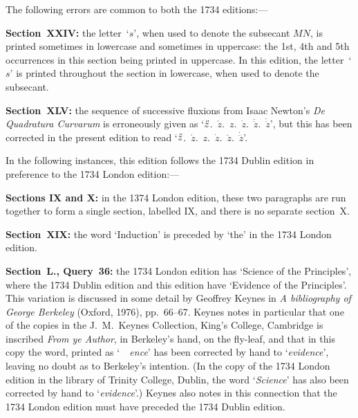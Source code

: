 \vfill\eject

The following errors are common to both the 1734 editions:---

\smallskip

\item{}
{\bf Section~XXIV:}
the letter~`$s$', when used to denote the subsecant $MN$, is
printed sometimes in lowercase and sometimes in uppercase: the
1st, 4th and 5th occurrences in this section being printed in
uppercase.  In this edition, the letter~`$s$' is printed
throughout the section in lowercase, when used to denote the
subsecant.

\smallskip

\item{}
{\bf Section~XLV:}
the sequence of successive fluxions from Isaac Newton's
{\it De Quadratura Curvarum\/} is erroneously given as
`$\doubleacute{z}$.\ $\acute{z}$.\ $z$.\ $\dot{z}$.\
$\ddot{\ddot{z}}$.\ $\dot{\ddot{z}}$', but this has been
corrected in the present edition to read
`$\doubleacute{z}$.\ $\acute{z}$.\ $z$.\ $\dot{z}$.\
$\ddot{z}$.\ $\dot{\ddot{z}}$'.

\bigbreak

In the following instances, this edition follows the
1734 Dublin edition in preference to the 1734 London
edition:---

\smallskip

\item{}
{\bf Sections IX and X:}
in the 1374 London edition, these two paragraphs are run together
to form a single section, labelled IX, and there is no separate
section~X.

\smallskip

\item{}
{\bf Section~XIX:}
the word `Induction' is preceded by `the' in the 1734 London
edition.

\smallskip

\item{}
{\bf Section~L., Query~36:}
the 1734 London edition has `Science of the Principles', where
the 1734 Dublin edition and this edition have `Evidence of the
Principles'.  This variation is discussed in some detail by
Geoffrey Keynes in {\it A bibliography of George Berkeley}
(Oxford, 1976), pp.\ 66--67.  Keynes notes in particular that one
of the copies in the J.~M.\ Keynes Collection, King's College,
Cambridge is inscribed {\it From ye Author\/}, in Berkeley's
hand, on the fly-leaf, and that in this copy the word, printed as
`{\it \ \ ence\/}' has been corrected by hand to `{\it evidence\/}',
leaving no doubt as to Berkeley's intention.  (In the copy of the
1734 London edition in the library of Trinity College, Dublin,
the word `{\it Science\/}' has also been corrected by hand to
`{\it evidence\/}'.)  Keynes also notes in this connection that
the 1734 London edition must have preceded the 1734 Dublin
edition.

